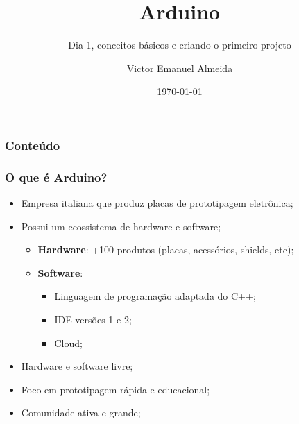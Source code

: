 \documentclass[12pt]{beamer}
\author{Victor Emanuel Almeida}
\title{Arduino}
\subtitle{Dia 1, conceitos básicos e criando o primeiro projeto}
\date{\today}
\institute{UNIOESTE}
\begin{document}
\frame{\titlepage}

\begin{frame}
    \frametitle{Conteúdo}
    \tableofcontents
\end{frame}

\begin{frame}
    \frametitle{O que é Arduino?}

    \begin{itemize}
        \item Empresa italiana que produz placas de prototipagem eletrônica;
        \item Possui um ecossistema de hardware e software;
        \begin{itemize}
            \item\textbf{Hardware}: +100 produtos (placas, acessórios, shields, etc)\cite{site_arduino};
            \item\textbf{Software}:
            \begin{itemize}
                \item Linguagem de programação adaptada do C++;
                \item IDE versões 1 e 2;
                \item Cloud;
            \end{itemize}
        \end{itemize}
        \item Hardware e software livre;
        \item Foco em prototipagem rápida e educacional;
        \item Comunidade ativa e grande;
    \end{itemize}
\end{frame}
\end{document}
